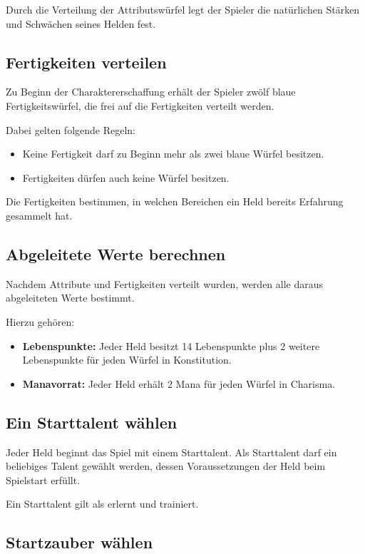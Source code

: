 Durch die Verteilung der Attributswürfel legt der Spieler die natürlichen Stärken und Schwächen seines Helden fest.

\subsection{Fertigkeiten verteilen}

Zu Beginn der Charaktererschaffung erhält der Spieler zwölf blaue Fertigkeitswürfel, die frei auf die Fertigkeiten verteilt werden.

Dabei gelten folgende Regeln:

\begin{itemize}
  \item Keine Fertigkeit darf zu Beginn mehr als zwei blaue Würfel besitzen.
  \item Fertigkeiten dürfen auch keine Würfel besitzen.
\end{itemize}

Die Fertigkeiten bestimmen, in welchen Bereichen ein Held bereits Erfahrung gesammelt hat.

\subsection{Abgeleitete Werte berechnen}

Nachdem Attribute und Fertigkeiten verteilt wurden, werden alle daraus abgeleiteten Werte bestimmt.

Hierzu gehören:

\begin{itemize}
  \item \textbf{Lebenspunkte:} Jeder Held besitzt 14 Lebenspunkte plus 2 weitere Lebenspunkte für jeden Würfel in Konstitution.
  \item \textbf{Manavorrat:} Jeder Held erhält 2 Mana für jeden Würfel in Charisma.
\end{itemize}

\subsection{Ein Starttalent wählen}

Jeder Held beginnt das Spiel mit einem Starttalent. Als Starttalent darf ein beliebiges Talent gewählt werden, dessen Voraussetzungen der Held beim Spielstart erfüllt.

Ein Starttalent gilt als erlernt und trainiert.

\subsection{Startzauber wählen}

